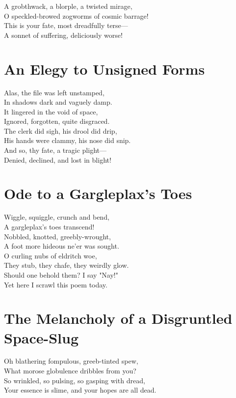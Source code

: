 \documentclass[a4paper,12pt]{article}
\begin{document}
	A grobthwack, a blorple, a twisted mirage,\\
	O speckled-browed zogworms of cosmic barrage!\\
	This is your fate, most dreadfully terse—\\
	A sonnet of suffering, deliciously worse!\\
	\vfill\newpage
	
	\section{An Elegy to Unsigned Forms}
	\vfill
	\raggedright
	Alas, the file was left unstamped,\\
	In shadows dark and vaguely damp.\\
	It lingered in the void of space,\\
	Ignored, forgotten, quite disgraced.\\
	
	The clerk did sigh, his drool did drip,\\
	His hands were clammy, his nose did snip.\\
	And so, thy fate, a tragic plight—\\
	Denied, declined, and lost in blight!\\
	\vfill\newpage
	
	\section{Ode to a Gargleplax’s Toes}
	\vfill
	\raggedright
	Wiggle, squiggle, crunch and bend,\\
	A gargleplax's toes transcend!\\
	Nobbled, knotted, greebly-wrought,\\
	A foot more hideous ne'er was sought.\\
	
	O curling nubs of eldritch woe,\\
	They stub, they chafe, they weirdly glow.\\
	Should one behold them? I say "Nay!"\\
	Yet here I scrawl this poem today.\\
	\vfill\newpage
	
	\section{The Melancholy of a Disgruntled Space-Slug}
	\vfill
	\raggedright
	Oh blathering fompulous, greeb-tinted spew,\\
	What morose globulence dribbles from you?\\
	So wrinkled, so pulsing, so gasping with dread,\\
	Your essence is slime, and your hopes are all dead.\\
	
\end{document}
